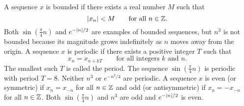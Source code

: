 A sequence $x$ is bounded if there exists a real number $M$ such that 
\[
\vert x_n \vert < M \qquad \text{for all $n \in {\mathbb Z}$}.
\]
Both $\sin( \tfrac{\pi}{4} n)$ and $e^{-\vert n \vert/2}$ are examples of bounded sequences, but $n^3$ is not bounded because its magnitude grows indefinitely as $n$ moves away from the origin.  A sequence $x$ is periodic if there exists a positive integer $T$ such that
\[
x_n = x_{n + kT} \qquad \text{for all integers $k$ and $n$.}
\] 
The smallest such $T$ is called the period.  The sequence $\sin( \tfrac{\pi}{4} n )$ is periodic with period $T=8$.  Neither $n^3$ or $e^{-n^2/4}$ are periodic.  
A sequence $x$ is even (or symmetric) if $x_n = x_{-n}$ for all $n \in {\mathbb Z}$ and odd (or antisymmetric) if $x_n = -x_{-n}$ for all $n \in {\mathbb Z}$.  Both $\sin(\frac{\pi}{4} n)$ and $n^3$ are odd and $e^{-\vert n \vert/2}$ is even.  

